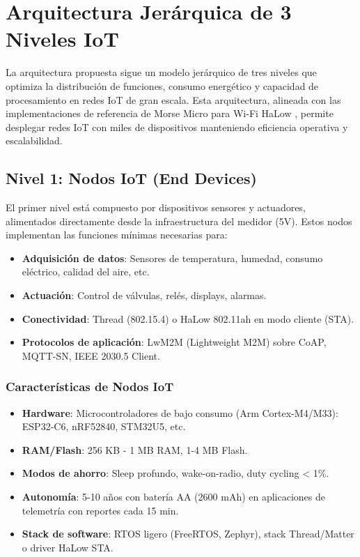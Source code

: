 \section{Arquitectura Jerárquica de 3 Niveles IoT}

La arquitectura propuesta sigue un modelo jerárquico de tres niveles que optimiza la distribución de funciones, consumo energético y capacidad de procesamiento en redes IoT de gran escala. Esta arquitectura, alineada con las implementaciones de referencia de Morse Micro para Wi-Fi HaLow \cite{morse_micro_mm8108_2025}, permite desplegar redes IoT con miles de dispositivos manteniendo eficiencia operativa y escalabilidad.

\subsection{Nivel 1: Nodos IoT (End Devices)}

El primer nivel está compuesto por dispositivos sensores y actuadores, alimentados directamente desde la infraestructura del medidor (5V). Estos nodos implementan las funciones mínimas necesarias para:

\begin{itemize}
    \item \textbf{Adquisición de datos}: Sensores de temperatura, humedad, consumo eléctrico, calidad del aire, etc.
    \item \textbf{Actuación}: Control de válvulas, relés, displays, alarmas.
    \item \textbf{Conectividad}: Thread (802.15.4) o HaLow 802.11ah en modo cliente (STA).
    \item \textbf{Protocolos de aplicación}: LwM2M (Lightweight M2M) sobre CoAP, MQTT-SN, IEEE 2030.5 Client.
\end{itemize}

\subsubsection{Características de Nodos IoT}

\begin{itemize}
    \item \textbf{Hardware}: Microcontroladores de bajo consumo (Arm Cortex-M4/M33): ESP32-C6, nRF52840, STM32U5, etc.
    \item \textbf{RAM/Flash}: 256 KB - 1 MB RAM, 1-4 MB Flash.
    \item \textbf{Modos de ahorro}: Sleep profundo, wake-on-radio, duty cycling < 1\%.
    \item \textbf{Autonomía}: 5-10 años con batería AA (2600 mAh) en aplicaciones de telemetría con reportes cada 15 min.
    \item \textbf{Stack de software}: RTOS ligero (FreeRTOS, Zephyr), stack Thread/Matter o driver HaLow STA.
\end{itemize}

